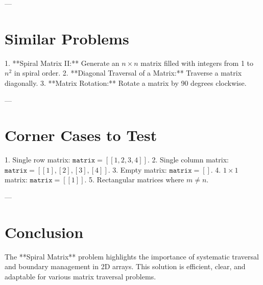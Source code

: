 ---

\section*{Similar Problems}
1. **Spiral Matrix II:** Generate an \(n \times n\) matrix filled with integers from 1 to \(n^2\) in spiral order.
2. **Diagonal Traversal of a Matrix:** Traverse a matrix diagonally.
3. **Matrix Rotation:** Rotate a matrix by 90 degrees clockwise.

---

\section*{Corner Cases to Test}
1. Single row matrix: \(\texttt{matrix} = [[1, 2, 3, 4]]\).
2. Single column matrix: \(\texttt{matrix} = [[1], [2], [3], [4]]\).
3. Empty matrix: \(\texttt{matrix} = []\).
4. \(1 \times 1\) matrix: \(\texttt{matrix} = [[1]]\).
5. Rectangular matrices where \(m \neq n\).

---

\section*{Conclusion}
The **Spiral Matrix** problem highlights the importance of systematic traversal and boundary management in 2D arrays. This solution is efficient, clear, and adaptable for various matrix traversal problems.